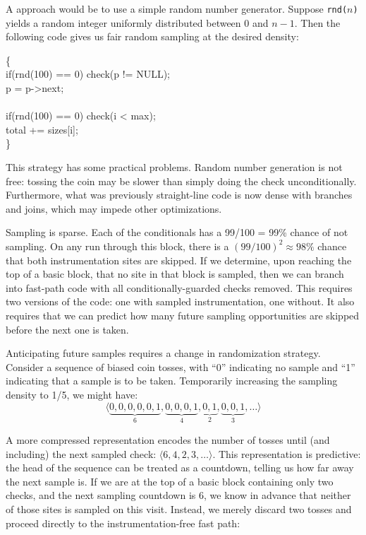 A \naive approach would be to use a simple random number generator.
Suppose \texttt{rnd($n$)} yields a random integer uniformly
distributed between 0 and $n-1$.  Then the following code gives us
fair random sampling at the desired density:

\begin{code}
  \{\+ \\
  if(rnd(100) == 0) check(p != NULL); \\
  \up p = p->next; \\
  \\
  if(rnd(100) == 0) check(i < max); \\
  \up total += sizes[i]; \\
  \<\}
\end{code}

This strategy has some practical problems.  Random number generation
is not free: tossing the coin may be slower than simply doing the
check unconditionally.  Furthermore, what was previously straight-line
code is now dense with branches and joins, which may impede other
optimizations.

Sampling is sparse.  Each of the conditionals has a 99/100 = 99\%
chance of not sampling.  On any run through this block, there is a
$(99/100)^2 \approx 98\%$ chance that both instrumentation sites are
skipped.  If we determine, upon reaching the top of a basic
block, that no site in that block is sampled, then we can
branch into fast-path code with all conditionally-guarded
checks removed.  This requires two versions of the code: one
with sampled instrumentation, one without.  It also requires that we
can predict how many future sampling opportunities are
skipped before the next one is taken.

Anticipating future samples requires a change in randomization
strategy.  Consider a sequence of biased coin tosses, with ``0''
indicating no sample and ``1'' indicating that a sample is to be
taken.  Temporarily increasing the sampling density to 1/5, we might
have:
\begin{equation*}
  \langle
  \underbrace{0, 0, 0, 0, 0, 1}_6,
  \underbrace{0, 0, 0, 1}_4,
  \underbrace{0, 1}_2,
  \underbrace{0, 0, 1}_3,
  \dots
  \rangle
\end{equation*}

A more compressed representation encodes the number of
tosses until (and including) the next sampled check: $\langle6, 4, 2, 3,
\dots\rangle$.  This representation is 
predictive: the head of the
sequence can be treated as a countdown, telling us how far away the
next sample is.  If we are at the top of a basic block containing only
two checks, and the next sampling countdown is 6, we know in advance
that neither of those sites is sampled on this visit.  Instead,
we merely discard two tosses and proceed directly to the
instrumentation-free fast path:

